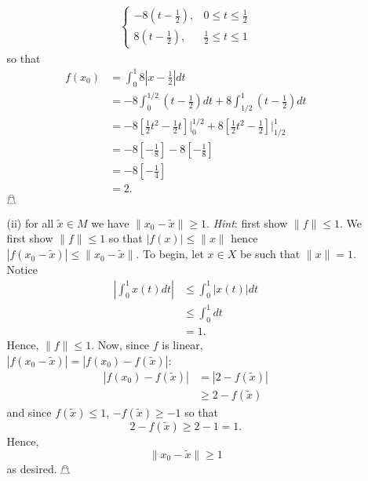 \documentclass{article}
\begin{document}
\begin{itemize}
\begin{itemize}
\begin{align*}
\begin{cases}
                -8\left(t - \frac{1}{2}\right), & 0\leq t \leq \frac{1}{2}\\
                8\left(t - \frac{1}{2}\right), & \frac{1}{2} \leq t \leq 1
            \end{cases}
        \end{align*}
        so that
        \begin{align*}
            f(x_0) &= \int_0^1 8|x - \tfrac{1}{2}|dt\\
            &= -8\int_0^{1/2} (t - \tfrac{1}{2})dt + 8\int_{1/2}^1 (t - \tfrac{1}{2})dt\\
            &= -8\left[\frac{1}{2}t^2 - \frac{1}{2}t\right]\bigg|_0^{1/2} + 8\left[\frac{1}{2}t^2 - \frac{1}{2}\right]\bigg|_{1/2}^1\\
            &= -8\left[-\frac{1}{8}\right] - 8\left[-\frac{1}{8}\right]\\
            &= -8\left[-\frac{1}{4}\right]\\
            &= 2.
        \end{align*}
        \hfill $\mathghost$
        

        \item[(ii)] for all $\tilde{x} \in M$ we have $\|x_0 - \tilde{x}\| \geq 1$. \textit{Hint}: first show $\|f\| \leq 1$.
        \newline\newline
        We first show $\|f\|\leq 1$ so that $|f(x)| \leq \|x\|$ hence $|f(x_0 - \tilde{x})| \leq \|x_0 - \tilde{x}\|$. To begin, let $x \in X$ be such that $\|x\| = 1$. Notice
        \begin{align*}
            \left|\int_0^1 x(t) dt\right| &\leq \int_0^1 |x(t)| dt\\
            &\leq \int_0^1 dt\\
            &= 1.
        \end{align*}
        Hence, $\|f\| \leq 1$. Now, since $f$ is linear, $|f(x_0 - \tilde{x})| = |f(x_0) - f(\tilde{x})|$:
        \begin{align*}
            |f(x_0) - f(\tilde{x})| &= |2 - f(\tilde{x})|\\
            &\geq 2 - f(\tilde{x})
        \end{align*}
        and since $f(\tilde{x}) \leq 1$, $-f(\tilde{x}) \geq -1$ so that
        \[2 - f(\tilde{x}) \geq 2 - 1 = 1.\]
        Hence,
        \[\|x_0 - \tilde{x}\| \geq 1\]
        as desired. \hfill $\mathghost$


\end{itemize}
\end{itemize}
\end{document}
